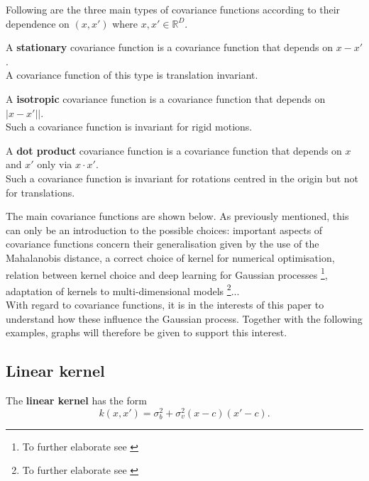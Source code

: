 Following are the three main types of covariance functions according to their dependence on $(x,x')$ where $x,x'\in \mathbb{R}^D$.




\begin{defi}
  A \textbf{stationary} covariance function is a covariance function that depends on $x-x'$.\\
  A covariance function of this type is translation invariant.
\end{defi}

\begin{defi}
  A \textbf{isotropic} covariance function is a covariance function that depends on $|x-x'||$.\\
  Such a covariance function is invariant for rigid motions.
\end{defi}

\begin{defi}
  A \textbf{dot product} covariance function is a covariance function that depends on $x$ and $x'$ only via $x\cdot x'$.\\
  Such a covariance function is invariant for rotations centred in the origin but not for translations.
\end{defi}

The main covariance functions are shown below. As previously mentioned, this can only be an introduction to the possible choices: important aspects of covariance functions concern their generalisation given by the use of the Mahalanobis distance, a correct choice of kernel for numerical optimisation, relation between kernel choice and deep learning for Gaussian processes \footnote{To further elaborate see \cite{murphy_probabilistic_2022}}, adaptation of kernels to multi-dimensional models \footnote{To further elaborate see \cite{duvenaud_automatic_2014}}...\\
With regard to covariance functions, it is in the interests of this paper to understand how these influence the Gaussian process. Together with the following examples, graphs will therefore be given to support this interest.

\newpage

\subsection{Linear kernel}
\begin{defi}
  The \textbf{linear kernel} has the form \[
k(x,x')=\sigma_b^2+\sigma_v^2 (x-c)(x'-c).
\]
\end{defi}

